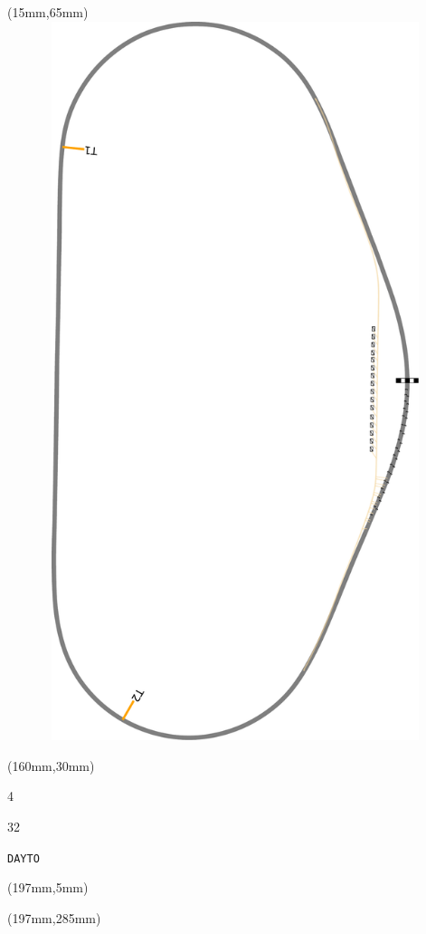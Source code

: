 \begin{textblock*}{185mm}(15mm,65mm)%
\centering
\mbox{\includegraphics[width=185mm,height=210mm,keepaspectratio]{PT/DAYTO.pdf}}
\end{textblock*}
\begin{textblock*}{40mm}(160mm,30mm)%
\Large
\par{} 
\par4 
\par32 
\par\hfill\tiny\tt DAYTO\\
\end{textblock*}
\begin{textblock*}{20mm}(197mm,5mm)%
\fbox{\thepage}
\label{DAYTO}
\end{textblock*}
\begin{textblock*}{20mm}(197mm,285mm)%
\fbox{\thepage}
\end{textblock*}

